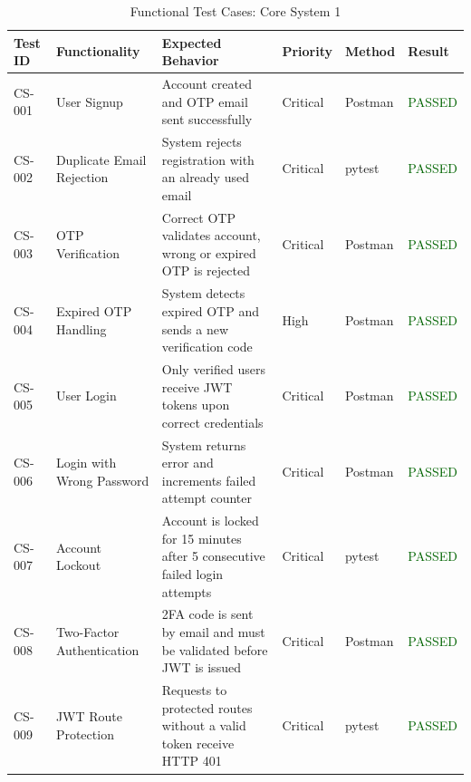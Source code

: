 \begin{table}[H]
\centering
\caption{Functional Test Cases: Core System 1}
\renewcommand{\arraystretch}{1.4}
\begin{tabular}{|p{1.6cm}|p{3cm}|p{3.8cm}|p{1.6cm}|p{1.6cm}|p{1.7cm}|}
\hline
\rowcolor{green!10}
\textbf{Test ID} & \textbf{Functionality} & \textbf{Expected Behavior} & \textbf{Priority} & \textbf{Method} & \textbf{Result} \\
\hline
CS-001 & User Signup & Account created and OTP email sent successfully & Critical & Postman & \textcolor{darkgreen}{PASSED} \\
\hline
CS-002 & Duplicate Email Rejection & System rejects registration with an already used email & Critical & pytest & \textcolor{darkgreen}{PASSED} \\
\hline
CS-003 & OTP Verification & Correct OTP validates account, wrong or expired OTP is rejected & Critical & Postman & \textcolor{darkgreen}{PASSED} \\
\hline
CS-004 & Expired OTP Handling & System detects expired OTP and sends a new verification code & High & Postman & \textcolor{darkgreen}{PASSED} \\
\hline
CS-005 & User Login & Only verified users receive JWT tokens upon correct credentials & Critical & Postman & \textcolor{darkgreen}{PASSED} \\
\hline
CS-006 & Login with Wrong Password & System returns error and increments failed attempt counter & Critical & Postman & \textcolor{darkgreen}{PASSED} \\
\hline
CS-007 & Account Lockout & Account is locked for 15 minutes after 5 consecutive failed login attempts & Critical & pytest & \textcolor{darkgreen}{PASSED} \\
\hline
CS-008 & Two-Factor Authentication & 2FA code is sent by email and must be validated before JWT is issued & Critical & Postman & \textcolor{darkgreen}{PASSED} \\
\hline
CS-009 & JWT Route Protection & Requests to protected routes without a valid token receive HTTP 401 & Critical & pytest & \textcolor{darkgreen}{PASSED} \\
\hline
\end{tabular}
\end{table}

